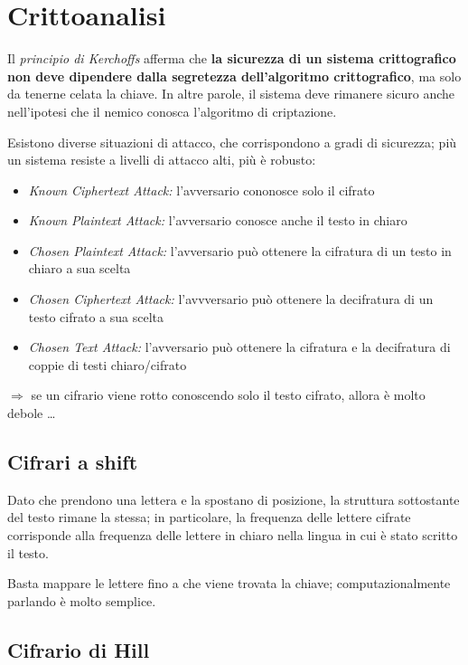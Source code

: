 \chapter{Crittoanalisi}

Il \textit{principio di Kerchoffs} afferma che \textbf{la sicurezza di un sistema crittografico non deve dipendere dalla segretezza 
dell'algoritmo crittografico}, ma solo da tenerne celata la chiave. In altre parole, il sistema deve rimanere sicuro anche nell'ipotesi che il 
nemico conosca l'algoritmo di criptazione.

\noindent Esistono diverse situazioni di attacco, che corrispondono a gradi di sicurezza; più un sistema resiste a livelli di attacco alti, 
più è robusto:
\begin{itemize}
    \item \textit{Known Ciphertext Attack:} l'avversario cononosce solo il cifrato 
    \item \textit{Known Plaintext Attack:} l'avversario conosce anche il testo in chiaro 
    \item \textit{Chosen Plaintext Attack:} l'avversario può ottenere la cifratura di un testo in chiaro a sua scelta
    \item \textit{Chosen Ciphertext Attack:} l'avvversario può ottenere la decifratura di un testo cifrato a sua scelta 
    \item \textit{Chosen Text Attack:} l'avversario può ottenere la cifratura e la decifratura di coppie di testi chiaro/cifrato
\end{itemize}

$\Rightarrow$ se un cifrario viene rotto conoscendo solo il testo cifrato, allora è molto debole \dots

\section{Cifrari a shift}
Dato che prendono una lettera e la spostano di posizione, la struttura sottostante del testo rimane la stessa; in particolare, la frequenza 
delle lettere cifrate corrisponde alla frequenza delle lettere in chiaro nella lingua in cui è stato scritto il testo. 

\noindent Basta mappare le lettere fino a che viene trovata la chiave; computazionalmente parlando è molto semplice.

\section{Cifrario di Hill}

